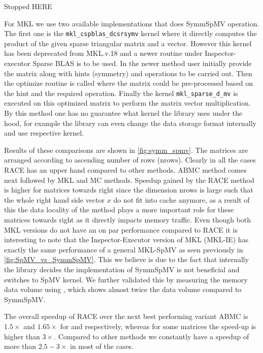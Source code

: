 {\GW Stopped HERE} 

For \acrshort{MKL} we use two available implementations that does \acrshort{SymmSpMV} operation. The first one is the \texttt{mkl\_cspblas\_dcsrsymv} kernel where it directly computes the product of the given sparse triangular matrix and a vector. However this kernel has been deprecated from \acrshort{MKL}.v.18 and a newer routine under Inspector-executor Sparse BLAS is to be used. In the newer method user initially provide the matrix along with hints (symmetry) and operations to be carried out. Then the optimize routine is called where the matrix could be pre-processed based on the hint and the required operation. Finally the kernel \texttt{mkl\_sparse\_d\_mv} is executed on this optimized matrix to perform the matrix vector multiplication. By this method one has no guarantee what kernel the library uses under the hood, for example the library can even change the data storage format internally and use respective kernel.

Results of these comparisons are shown in \cref{fig:symm_spmv}. The matrices are arranged according to ascending number of rows (\acrshort{nrows}). Clearly in all the cases \acrshort{RACE} has an upper hand compared to other methods. \acrshort{ABMC} method comes next followed by \acrshort{MKL} and \acrshort{MC} methods. Speedup gained by the \acrshort{RACE} method is higher for matrices towards right since the dimension \acrshort{nrows} is large such that the whole right hand side vector $x$ do not fit into cache anymore, as a result of this the data locality of the method plays a more important role for these matrices towards right as it directly impacts memory traffic. Even though both \acrshort{MKL} versions do not have an on par performance compared to \acrshort{RACE} it is interesting to note that the Inspector-Executor version of \acrshort{MKL} (MKL-IE) has exactly the same performance of a general MKL-\acrshort{SpMV} as seen previously in \cref{fig:SpMV_vs_SymmSpMV}. This we believe is due to the fact that internally the library decides the implementation of \acrshort{SymmSpMV}  is not beneficial and switches to \acrshort{SpMV} kernel. We further validated this by measuring the memory data volume using \LIKWID, which shows almost twice the data volume compared to \acrshort{SymmSpMV}.

The overall speedup of \acrshort{RACE} over the next best performing variant \acrshort{ABMC} is $1.5\times$ and $1.65 \times$ for \IVB and \SKX respectively, whereas for some matrices the speed-up is higher than $3 \times$. Compared to other methods we constantly have a speedup of more than $2.5 - 3 \times$ in most of the cases. 

